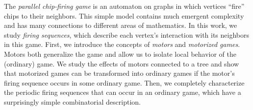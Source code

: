 The \emph{parallel chip-firing game} is an automaton on graphs in which
vertices ``fire'' chips to their neighbors. This simple model contains much
emergent complexity and has many connections to different areas of
mathematics. In this work, we study \emph{firing sequences}, which describe
each vertex's interaction with its neighbors in this game. First, we introduce
the concepts of \emph{motors} and \emph{motorized games}. Motors both
generalize the game and allow us to isolate local behavior of the (ordinary)
game. We study the effects of motors connected to a tree and show that
motorized games can be transformed into ordinary games if the motor's firing
sequence occurs in some ordinary game. Then, we completely characterize the
periodic firing sequences that can occur in an ordinary game, which have a
surprisingly simple combinatorial description.
